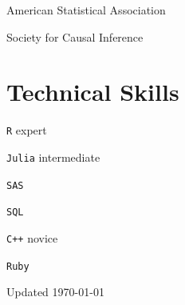 \documentclass[12pt,letterpaper]{report}
\newcommand{\listitemspace}{0.15em}
\renewenvironment{itemize}
{\begin{list}{}{\setlength{\leftmargin}{0em}
            \setlength{\parskip}{0em}
            \setlength{\itemsep}{\listitemspace}
            \setlength{\parsep}{\listitemspace}}}
    {\end{list}}
\begin{document}
    \begin{tablist}

        \item American Statistical Association
        
        \item Society for Causal Inference

    \end{tablist}

    \section*{Technical Skills}

    \begin{itemize}

        \item \texttt{R} \tab expert
        
        \item \texttt{Julia} \tab intermediate
        
        	\item \texttt{SAS}

		\item \texttt{SQL}
        
        \item \texttt{C++} \tab novice
        
        \item \texttt{Ruby}

    \end{itemize}

    \begin{center}
        \vfill
        Updated \monthyeardate\today
    \end{center}
\end{document}
